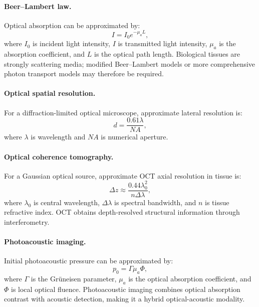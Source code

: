 \paragraph{Beer--Lambert law.} Optical absorption can be approximated by:
\begin{equation}
I=I_0 e^{-\mu_a L},
\end{equation}
where $I_0$ is incident light intensity, $I$ is transmitted light intensity, $\mu_a$ is the absorption coefficient, and $L$ is the optical path length. Biological tissues are strongly scattering media; modified Beer--Lambert models or more comprehensive photon transport models may therefore be required.

\paragraph{Optical spatial resolution.} For a diffraction-limited optical microscope, approximate lateral resolution is:
\begin{equation}
d=\frac{0.61\lambda}{NA},
\end{equation}
where $\lambda$ is wavelength and $NA$ is numerical aperture.

\paragraph{Optical coherence tomography.} For a Gaussian optical source, approximate OCT axial resolution in tissue is:
\begin{equation}
\Delta z\approx\frac{0.44\lambda_0^2}{n\Delta\lambda},
\end{equation}
where $\lambda_0$ is central wavelength, $\Delta\lambda$ is spectral bandwidth, and $n$ is tissue refractive index. OCT obtains depth-resolved structural information through interferometry.

\paragraph{Photoacoustic imaging.} Initial photoacoustic pressure can be approximated by:
\begin{equation}
p_0=\Gamma\mu_a\Phi,
\end{equation}
where $\Gamma$ is the Gr\"uneisen parameter, $\mu_a$ is the optical absorption coefficient, and $\Phi$ is local optical fluence. Photoacoustic imaging combines optical absorption contrast with acoustic detection, making it a hybrid optical-acoustic modality.

